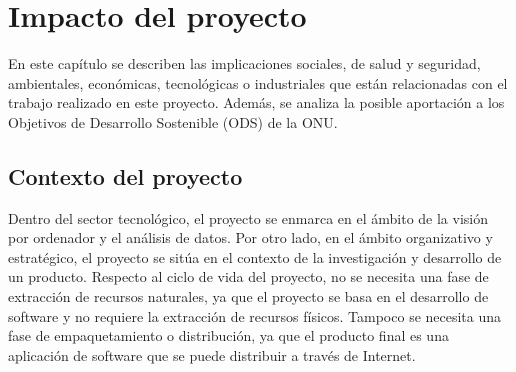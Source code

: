 \chapter{Impacto del proyecto} \label{sec:cap5}


    

\noindent En este capítulo se describen las implicaciones sociales, de salud y seguridad, ambientales, económicas, tecnológicas o industriales que están relacionadas con el trabajo realizado en este proyecto. Además, se analiza la posible aportación a los Objetivos de Desarrollo Sostenible (ODS) de la ONU.

\section{Contexto del proyecto}

Dentro del sector tecnológico, el proyecto se enmarca en el ámbito de la visión por ordenador y el análisis de datos. Por otro lado, en el ámbito organizativo y estratégico, el proyecto se sitúa en el contexto de la investigación y desarrollo de un producto. Respecto al ciclo de vida del proyecto, no se necesita una fase de extracción de recursos naturales, ya que el proyecto se basa en el desarrollo de software y no requiere la extracción de recursos físicos. Tampoco se necesita una fase de empaquetamiento o distribución, ya que el producto final es una aplicación de software que se puede distribuir a través de Internet. 

